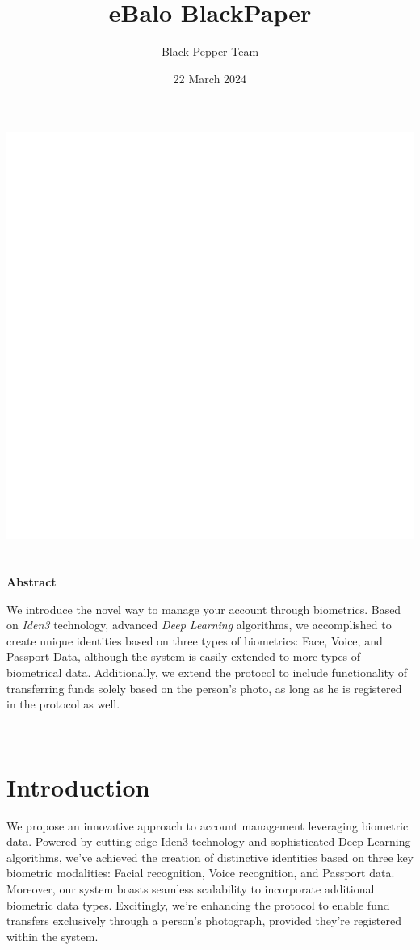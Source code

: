 \documentclass[a4, 14pt]{extarticle}
\title{eBalo BlackPaper}
\author{Black Pepper Team}
\date{22 March 2024}
\begin{document}
\makeatletter
    \begin{titlepage}
        \begin{center}
            \includegraphics[width=0.3\linewidth]{images/logo.png}\\[4ex]
            {\Huge \bfseries  \@title }\\[2ex] 
            { \Large \textit{\@author} } \\[5ex]
            {\textbf{Abstract}}\\
            \begin{flushleft}\small We introduce the novel way to manage your account through biometrics. Based on \textit{Iden3} technology, advanced \textit{Deep Learning} algorithms, we accomplished to create unique identities based on three types of biometrics: Face, Voice, and Passport Data, although the system is easily extended to more types of biometrical data. Additionally, we extend the protocol to include functionality of transferring funds solely based on the person's photo, as long as he is registered in the protocol as well.
            \end{flushleft}
            \\[20ex]
            {\large \@date}
        \end{center}
    \end{titlepage}
\makeatother
\thispagestyle{empty}
\newpage

\newpage

\section{Introduction}

We propose an innovative approach to account management leveraging biometric data. Powered by cutting-edge Iden3 technology and sophisticated Deep Learning algorithms, we've achieved the creation of distinctive identities based on three key biometric modalities: Facial recognition, Voice recognition, and Passport data. Moreover, our system boasts seamless scalability to incorporate additional biometric data types. Excitingly, we're enhancing the protocol to enable fund transfers exclusively through a person's photograph, provided they're registered within the system.
\end{document}

